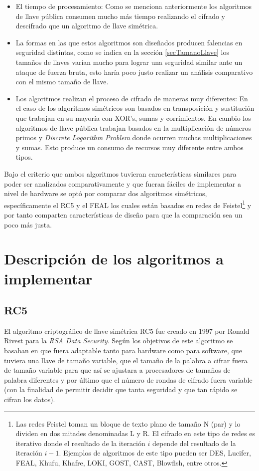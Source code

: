 \begin{itemize}
\item El tiempo de procesamiento: Como se menciona anteriormente los algoritmos de llave pública consumen mucho más tiempo realizando el cifrado y descifrado que un algoritmo de llave simétrica.

\item La formas en las que estos algoritmos son diseñados producen falencias en seguridad distintas, como se indica en la sección \ref{secTamanoLlave} los tamaños de llaves varían mucho para lograr una seguridad similar ante un ataque de fuerza bruta, esto haría poco justo realizar un análisis comparativo con el mismo tamaño de llave.

\item Los algoritmos realizan el proceso de cifrado de maneras muy diferentes: En el caso de los algoritmos simétricos son basados en transposición y sustitución que trabajan en su mayoría con XOR's, sumas y corrimientos. En cambio los algoritmos de llave pública trabajan  basados en la multiplicación de números primos y \textit{Discrete Logarithm Problem} donde ocurren muchas multiplicaciones y sumas. Esto produce un consumo de recursos muy diferente entre ambos tipos.
\end{itemize}

Bajo el criterio que ambos algoritmos tuvieran características similares para poder ser analizados comparativamente y que fueran fáciles de implementar a nivel de hardware se optó por comparar dos algoritmos simétricos, específicamente el RC5 y el FEAL los cuales están basados en redes de Feistel\footnote{
Las redes Feistel toman un bloque de texto plano de tamaño N (par) y lo dividen en dos mitades denominadas L y R. El cifrado en este tipo de redes es iterativo donde el resultado de la iteración $i$ depende del resultado de la iteración $i - 1 $. Ejemplos de algoritmos de este tipo pueden ser DES, Lucifer, FEAL, Khufu, Khafre, LOKI, GOST, CAST, Blowfish, entre otros.} y por tanto comparten características de diseño para que la comparación sea un poco más justa.





\section{Descripción de los algoritmos a implementar}
\subsection{RC5}
El algoritmo criptográfico de llave simétrica RC5 fue creado en 1997 por Ronald Rivest para la \textit{RSA Data Security}. Según \cite{rivest} los objetivos de este algoritmo se basaban en que fuera adaptable tanto para hardware como para software, que tuviera una llave de tamaño variable, que el tamaño de la palabra a cifrar fuera de tamaño variable para que así se ajustara a procesadores de tamaños de palabra diferentes y por último que el número de rondas de cifrado fuera variable (con la finalidad de permitir decidir que tanta seguridad y que tan rápido se cifran los datos).


